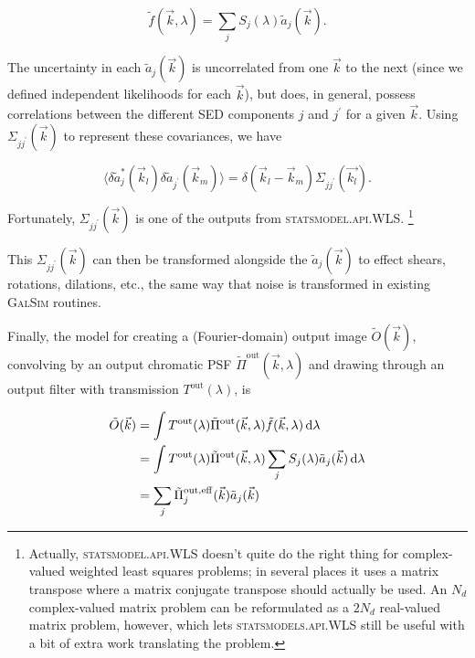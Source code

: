 \documentclass{article}
\begin{document}
\begin{equation}
  \tilde{f}(\vec{k}, \lambda) = \sum_j S_j(\lambda) \tilde{a}_j(\vec{k}).
\end{equation}

The uncertainty in each $\tilde{a}_j(\vec{k})$ is uncorrelated from one $\vec{k}$ to the next (since
we defined independent likelihoods for each $\vec{k}$), but does, in general, possess correlations
between the different SED components $j$ and $j^\prime$ for a given $\vec{k}$.  Using
$\Sigma_{jj^\prime}(\vec{k})$ to represent these covariances, we have

\begin{equation}
    \langle\delta\tilde{a}^*_j(\vec{k}_l)\delta\tilde{a}_{j^\prime}(\vec{k}_m)\rangle = \delta(\vec{k}_l - \vec{k}_m)\Sigma_{jj^\prime}(\vec{k_l}).
\end{equation}

Fortunately, $\Sigma_{jj^\prime}(\vec{k})$ is one of the outputs from \textsc{statsmodel.api.WLS}.
\footnote{Actually, \textsc{statsmodel.api.WLS} doesn't quite do the right thing for complex-valued
weighted least squares problems; in several places it uses a matrix transpose where a matrix
conjugate transpose should actually be used.  An $N_d$ complex-valued matrix problem can be
reformulated as a $2 N_d$ real-valued matrix problem, however, which lets
\textsc{statsmodels.api.WLS} still be useful with a bit of extra work translating the problem.}

This $\Sigma_{jj^\prime}(\vec{k})$ can then be transformed alongside the $\tilde{a}_j(\vec{k})$ to
effect shears, rotations, dilations, etc., the same way that noise is transformed in existing
\textsc{GalSim} routines.

Finally, the model for creating a (Fourier-domain) output image $\tilde{O}(\vec{k})$, convolving by
an output chromatic PSF $\tilde{\Pi}^\mathrm{out}(\vec{k}, \lambda)$ and drawing through an output
filter with transmission $T^\mathrm{out}(\lambda)$, is

\begin{align}
    \tilde{O}(\vec{k})
    &= \int T^\mathrm{out}(\lambda) \tilde{\Pi}^\mathrm{out}(\vec{k}, \lambda) \tilde{f}(\vec{k}, \lambda) \dif{\lambda} \\
    &= \int T^\mathrm{out}(\lambda) \tilde{\Pi}^\mathrm{out}(\vec{k}, \lambda) \sum_j S_j(\lambda) \tilde{a}_j(\vec{k}) \dif{\lambda} \\
    &= \sum_j \tilde{\Pi}_j^\mathrm{out, eff}(\vec{k}) \tilde{a}_j(\vec{k})
\end{align}
\end{document}
